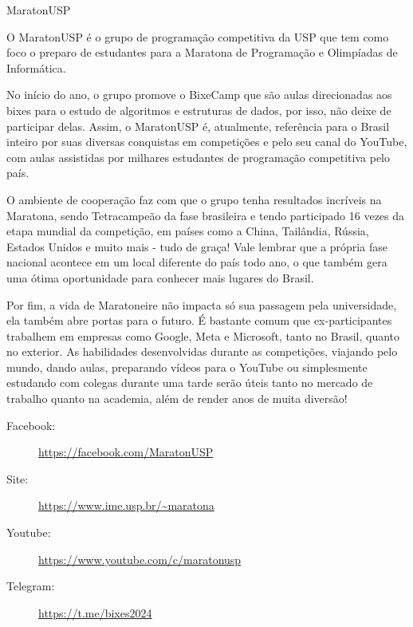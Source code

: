 \begin{subsecao}{MaratonUSP}


O MaratonUSP é o grupo de programação competitiva da USP que tem como foco o
preparo de estudantes para a Maratona de Programação e Olimpíadas de Informática.

No início do ano, o grupo promove o BixeCamp que são aulas direcionadas aos bixes
para o estudo de algoritmos e estruturas de dados, por isso, não deixe de
participar delas. Assim, o MaratonUSP é, atualmente, referência para o
Brasil inteiro por suas diversas conquistas em competições e pelo seu canal do
YouTube, com aulas assistidas por milhares estudantes de programação competitiva
pelo país.

O ambiente de cooperação faz com que o grupo tenha resultados incríveis na
Maratona, sendo Tetracampeão da fase brasileira e tendo participado 16
vezes da etapa mundial da competição, em países como a China, Tailândia,
Rússia, Estados Unidos e muito mais - tudo de graça! Vale lembrar que a própria
fase nacional acontece em um local diferente do país todo ano, o que também gera
uma ótima oportunidade para conhecer mais lugares do Brasil.

Por fim, a vida de Maratoneire não impacta só sua passagem pela universidade,
ela também abre portas para o futuro. É bastante comum que ex-participantes
trabalhem em empresas como Google, Meta e Microsoft, tanto no Brasil,
quanto no exterior. As habilidades desenvolvidas durante as competições,
viajando pelo mundo, dando aulas, preparando vídeos para o YouTube ou
simplesmente estudando com colegas durante uma tarde serão úteis tanto no
mercado de trabalho quanto na academia, além de render anos de muita diversão!

\begin{description}
\item[Facebook:] \url{https://facebook.com/MaratonUSP}
\item[Site:] \url{https://www.ime.usp.br/~maratona}
\item[Youtube:] \url{https://www.youtube.com/c/maratonusp}
\item[Telegram:] \url{https://t.me/bixes2024}
\end{description}

\end{subsecao}
